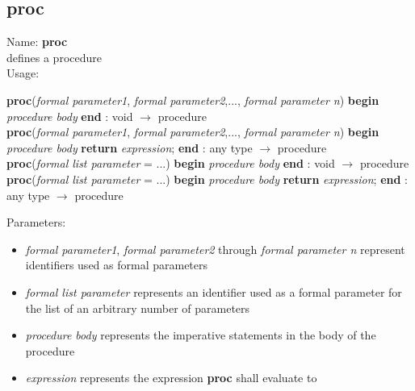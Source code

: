 \subsection{proc}
\label{labproc}
\noindent Name: \textbf{proc}\\
defines a \sollya procedure\\
\noindent Usage: 
\begin{center}
\textbf{proc}(\emph{formal parameter1}, \emph{formal parameter2},..., \emph{formal parameter n}) \textbf{begin} \emph{procedure body} \textbf{end} : \textsf{void} $\rightarrow$ \textsf{procedure}\\
\textbf{proc}(\emph{formal parameter1}, \emph{formal parameter2},..., \emph{formal parameter n}) \textbf{begin} \emph{procedure body} \textbf{return} \emph{expression}; \textbf{end} : \textsf{any type} $\rightarrow$ \textsf{procedure}\\
\textbf{proc}(\emph{formal list parameter} = ...) \textbf{begin} \emph{procedure body} \textbf{end} : \textsf{void} $\rightarrow$ \textsf{procedure}\\
\textbf{proc}(\emph{formal list parameter} = ...) \textbf{begin} \emph{procedure body} \textbf{return} \emph{expression}; \textbf{end} : \textsf{any type} $\rightarrow$ \textsf{procedure}\\
\end{center}
Parameters: 
\begin{itemize}
\item \emph{formal parameter1}, \emph{formal parameter2} through \emph{formal parameter n} represent identifiers used as formal parameters
\item \emph{formal list parameter} represents an identifier used as a formal parameter for the list of an arbitrary number of parameters
\item \emph{procedure body} represents the imperative statements in the body of the procedure
\item \emph{expression} represents the expression \textbf{proc} shall evaluate to
\end{itemize}
